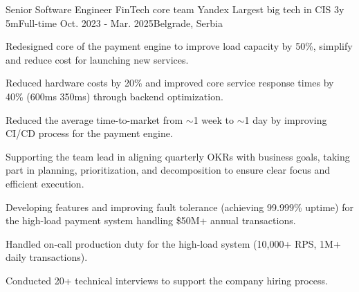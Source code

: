 \begin{cventries}
  \cventry
    {Senior Software Engineer} %
    {FinTech core team} %
    {Yandex} %
    {Largest big tech in CIS} %
    {3y 5m{\enskip\cdotp\enskip}Full-time} %
    {Oct. 2023 - Mar. 2025{\enskip\cdotp\enskip}Belgrade, Serbia} %
    {
      \begin{cvitemstitled} %
        \item {Redesigned core of the payment engine to improve load capacity by 50\%, simplify and reduce cost for launching new services.}
        \item {Reduced hardware costs by 20\% and improved core service response times by 40\% (600ms \rightarrow 350ms) through backend optimization.}
        \item {Reduced the average time-to-market from $\sim$1 week to $\sim$1 day by improving CI/CD process for the payment engine.}
      \end{cvitemstitled}
      \begin{cvitemstitledended}
        \item {Supporting the team lead in aligning quarterly OKRs with business goals, taking part in planning, prioritization, and decomposition to ensure clear focus and efficient execution.}
        \item {Developing features and improving fault tolerance (achieving 99.999\% uptime) for the high-load payment system handling \$50M+ annual transactions.}
        \item {Handled on-call production duty for the high-load system (10,000+ RPS, 1M+ daily transactions).}
        \item {Conducted 20+ technical interviews to support the company hiring process.}
      \end{cvitemstitledended}
    }


\end{cventries}
